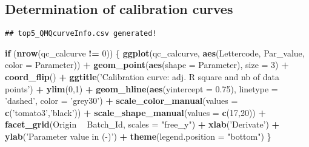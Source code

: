 \documentclass[9pt,]{article}
\newenvironment{Shaded}{\begin{snugshade}}{\end{snugshade}}
\newcommand{\KeywordTok}[1]{\textcolor[rgb]{0.13,0.29,0.53}{\textbf{#1}}}
\newcommand{\DataTypeTok}[1]{\textcolor[rgb]{0.13,0.29,0.53}{#1}}
\newcommand{\DecValTok}[1]{\textcolor[rgb]{0.00,0.00,0.81}{#1}}
\newcommand{\FloatTok}[1]{\textcolor[rgb]{0.00,0.00,0.81}{#1}}
\newcommand{\StringTok}[1]{\textcolor[rgb]{0.31,0.60,0.02}{#1}}
\newcommand{\ControlFlowTok}[1]{\textcolor[rgb]{0.13,0.29,0.53}{\textbf{#1}}}
\newcommand{\OperatorTok}[1]{\textcolor[rgb]{0.81,0.36,0.00}{\textbf{#1}}}
\newcommand{\NormalTok}[1]{#1}
\begin{document}
\subsection{Determination of calibration
curves}\label{determination-of-calibration-curves}

\begin{verbatim}
## top5_QMQcurveInfo.csv generated!
\end{verbatim}

\begin{Shaded}
\begin{Highlighting}[]
\ControlFlowTok{if}\NormalTok{ (}\KeywordTok{nrow}\NormalTok{(qc_calcurve }\OperatorTok{!=}\StringTok{ }\DecValTok{0}\NormalTok{)) \{}
  \KeywordTok{ggplot}\NormalTok{(qc_calcurve, }\KeywordTok{aes}\NormalTok{(Lettercode, Par_value, }\DataTypeTok{color =}\NormalTok{ Parameter)) }\OperatorTok{+}
\StringTok{        }\KeywordTok{geom_point}\NormalTok{(}\KeywordTok{aes}\NormalTok{(}\DataTypeTok{shape =}\NormalTok{ Parameter), }\DataTypeTok{size =} \DecValTok{3}\NormalTok{) }\OperatorTok{+}
\StringTok{    }\KeywordTok{coord_flip}\NormalTok{() }\OperatorTok{+}
\StringTok{    }\KeywordTok{ggtitle}\NormalTok{(}\StringTok{'Calibration curve: adj. R square and nb of data points'}\NormalTok{) }\OperatorTok{+}
\StringTok{    }\KeywordTok{ylim}\NormalTok{(}\DecValTok{0}\NormalTok{,}\DecValTok{1}\NormalTok{) }\OperatorTok{+}
\StringTok{    }\KeywordTok{geom_hline}\NormalTok{(}\KeywordTok{aes}\NormalTok{(}\DataTypeTok{yintercept =} \FloatTok{0.75}\NormalTok{), }\DataTypeTok{linetype =} \StringTok{'dashed'}\NormalTok{, }\DataTypeTok{color =} \StringTok{'grey30'}\NormalTok{) }\OperatorTok{+}
\StringTok{    }\KeywordTok{scale_color_manual}\NormalTok{(}\DataTypeTok{values =} \KeywordTok{c}\NormalTok{(}\StringTok{'tomato3'}\NormalTok{,}\StringTok{'black'}\NormalTok{)) }\OperatorTok{+}
\StringTok{    }\KeywordTok{scale_shape_manual}\NormalTok{(}\DataTypeTok{values =} \KeywordTok{c}\NormalTok{(}\DecValTok{17}\NormalTok{,}\DecValTok{20}\NormalTok{)) }\OperatorTok{+}
\StringTok{    }\KeywordTok{facet_grid}\NormalTok{(Origin }\OperatorTok{~}\StringTok{ }\NormalTok{Batch_Id, }\DataTypeTok{scales =} \StringTok{"free_y"}\NormalTok{) }\OperatorTok{+}
\StringTok{        }\KeywordTok{xlab}\NormalTok{(}\StringTok{'Derivate'}\NormalTok{) }\OperatorTok{+}
\StringTok{        }\KeywordTok{ylab}\NormalTok{(}\StringTok{'Parameter value in (-)'}\NormalTok{) }\OperatorTok{+}
\StringTok{    }\KeywordTok{theme}\NormalTok{(}\DataTypeTok{legend.position =} \StringTok{"bottom"}\NormalTok{)}
\NormalTok{\}}
\end{Highlighting}
\end{Shaded}
\end{document}
